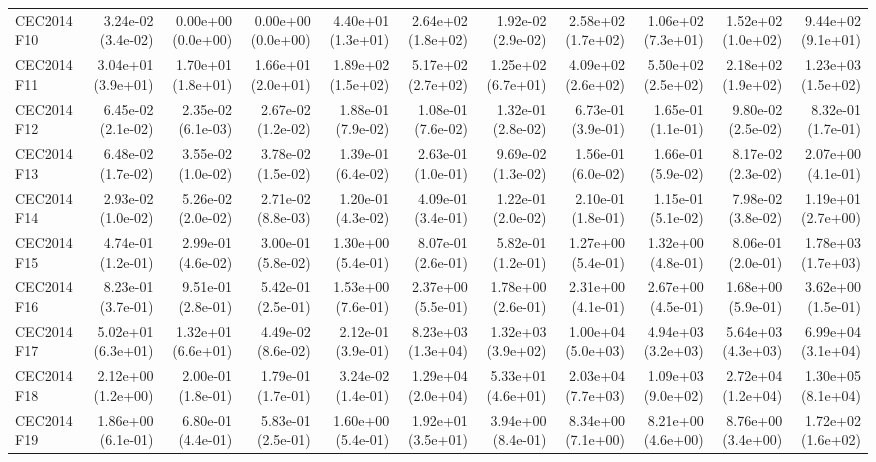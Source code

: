 \begin{longtable}{lrrrrrrrrrr}
CEC2014 F10 & 3.24e-02 (3.4e-02) & 0.00e+00 (0.0e+00) & 0.00e+00 (0.0e+00) & 4.40e+01 (1.3e+01) & 2.64e+02 (1.8e+02) & 1.92e-02 (2.9e-02) & 2.58e+02 (1.7e+02) & 1.06e+02 (7.3e+01) & 1.52e+02 (1.0e+02) & 9.44e+02 (9.1e+01) \\
CEC2014 F11 & 3.04e+01 (3.9e+01) & 1.70e+01 (1.8e+01) & 1.66e+01 (2.0e+01) & 1.89e+02 (1.5e+02) & 5.17e+02 (2.7e+02) & 1.25e+02 (6.7e+01) & 4.09e+02 (2.6e+02) & 5.50e+02 (2.5e+02) & 2.18e+02 (1.9e+02) & 1.23e+03 (1.5e+02) \\
CEC2014 F12 & 6.45e-02 (2.1e-02) & 2.35e-02 (6.1e-03) & 2.67e-02 (1.2e-02) & 1.88e-01 (7.9e-02) & 1.08e-01 (7.6e-02) & 1.32e-01 (2.8e-02) & 6.73e-01 (3.9e-01) & 1.65e-01 (1.1e-01) & 9.80e-02 (2.5e-02) & 8.32e-01 (1.7e-01) \\
CEC2014 F13 & 6.48e-02 (1.7e-02) & 3.55e-02 (1.0e-02) & 3.78e-02 (1.5e-02) & 1.39e-01 (6.4e-02) & 2.63e-01 (1.0e-01) & 9.69e-02 (1.3e-02) & 1.56e-01 (6.0e-02) & 1.66e-01 (5.9e-02) & 8.17e-02 (2.3e-02) & 2.07e+00 (4.1e-01) \\
CEC2014 F14 & 2.93e-02 (1.0e-02) & 5.26e-02 (2.0e-02) & 2.71e-02 (8.8e-03) & 1.20e-01 (4.3e-02) & 4.09e-01 (3.4e-01) & 1.22e-01 (2.0e-02) & 2.10e-01 (1.8e-01) & 1.15e-01 (5.1e-02) & 7.98e-02 (3.8e-02) & 1.19e+01 (2.7e+00) \\
CEC2014 F15 & 4.74e-01 (1.2e-01) & 2.99e-01 (4.6e-02) & 3.00e-01 (5.8e-02) & 1.30e+00 (5.4e-01) & 8.07e-01 (2.6e-01) & 5.82e-01 (1.2e-01) & 1.27e+00 (5.4e-01) & 1.32e+00 (4.8e-01) & 8.06e-01 (2.0e-01) & 1.78e+03 (1.7e+03) \\
CEC2014 F16 & 8.23e-01 (3.7e-01) & 9.51e-01 (2.8e-01) & 5.42e-01 (2.5e-01) & 1.53e+00 (7.6e-01) & 2.37e+00 (5.5e-01) & 1.78e+00 (2.6e-01) & 2.31e+00 (4.1e-01) & 2.67e+00 (4.5e-01) & 1.68e+00 (5.9e-01) & 3.62e+00 (1.5e-01) \\
CEC2014 F17 & 5.02e+01 (6.3e+01) & 1.32e+01 (6.6e+01) & 4.49e-02 (8.6e-02) & 2.12e-01 (3.9e-01) & 8.23e+03 (1.3e+04) & 1.32e+03 (3.9e+02) & 1.00e+04 (5.0e+03) & 4.94e+03 (3.2e+03) & 5.64e+03 (4.3e+03) & 6.99e+04 (3.1e+04) \\
CEC2014 F18 & 2.12e+00 (1.2e+00) & 2.00e-01 (1.8e-01) & 1.79e-01 (1.7e-01) & 3.24e-02 (1.4e-01) & 1.29e+04 (2.0e+04) & 5.33e+01 (4.6e+01) & 2.03e+04 (7.7e+03) & 1.09e+03 (9.0e+02) & 2.72e+04 (1.2e+04) & 1.30e+05 (8.1e+04) \\
CEC2014 F19 & 1.86e+00 (6.1e-01) & 6.80e-01 (4.4e-01) & 5.83e-01 (2.5e-01) & 1.60e+00 (5.4e-01) & 1.92e+01 (3.5e+01) & 3.94e+00 (8.4e-01) & 8.34e+00 (7.1e+00) & 8.21e+00 (4.6e+00) & 8.76e+00 (3.4e+00) & 1.72e+02 (1.6e+02) \\

\end{longtable}
